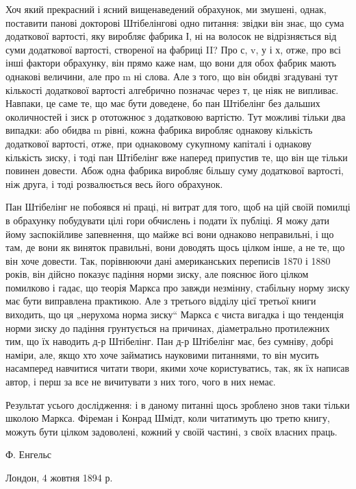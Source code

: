 Хоч який прекрасний і ясний вищенаведений обрахунок, ми
змушені, однак, поставити панові докторові Штібелінгові одно
питання: звідки він знає, що сума додаткової вартості, яку виробляє
фабрика І, ні на волосок не відрізняється від суми додаткової
вартості, створеної на фабриці II? Про с, v, у і х, отже,
про всі інші фактори обрахунку, він прямо каже нам, що вони
для обох фабрик мають однакові величини, але про m ні слова.
Але з того, що він обидві згадувані тут кількості додаткової
вартості алгебрично позначає через т, це ніяк не випливає.
Навпаки, це саме те, що має бути доведене, бо пан Штібелінг
без дальших околичностей і зиск р ототожнює з додатковою
вартістю. Тут можливі тільки два випадки: або обидва m рівні,
кожна фабрика виробляє однакову кількість додаткової вартості,
отже, при однаковому сукупному капіталі і однакову кількість
зиску, і тоді пан Штібелінг вже наперед припустив те, що він
ще тільки повинен довести. Абож одна фабрика виробляє більшу
суму додаткової вартості, ніж друга, і тоді розвалюється весь
його обрахунок.

Пан Штібелінг не побоявся ні праці, ні витрат для того, щоб
на цій своїй помилці в обрахунку побудувати цілі гори обчислень
і подати їх публіці. Я можу дати йому заспокійливе запевнення,
що майже всі вони однаково неправильні, і що там,
де вони як виняток правильні, вони доводять щось цілком інше,
а не те, що він хоче довести. Так, порівнюючи дані американських
переписів 1870 і 1880 років, він дійсно показує падіння
норми зиску, але пояснює його цілком помилково і гадає, що
теорія Маркса про завжди незмінну, стабільну норму зиску має
бути виправлена практикою. Але з третього відділу цієї третьої
книги виходить, що ця „нерухома норма зиску“ Маркса є чиста
вигадка і що тенденція норми зиску до падіння грунтується на
причинах, діаметрально протилежних тим, що їх наводить д-р
Штібелінг. Пан д-р Штібелінг має, без сумніву, добрі наміри,
але, якщо хто хоче займатись науковими питаннями, то він мусить
насамперед навчитися читати твори, якими хоче користуватись,
так, як їх написав автор, і перш за все не вичитувати
з них того, чого в них немає.

Результат усього дослідження: і в даному питанні щось
зроблено знов таки тільки школою Маркса. Фіреман і Конрад
Шмідт, коли читатимуть цю третю книгу, можуть бути цілком
задоволені, кожний у своїй частині, з своїх власних праць.

Ф. Енгельс

Лондон, 4 жовтня 1894 р.
